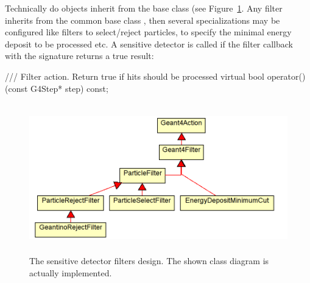 \noindent
Technically do  objects inherit from the base class
 (see Figure~\ref{fig:ddg4-implementation-sensitive-detector-filters}.
Any filter inherits from the common base class , then 
several specializations may be configured like filters to select/reject 
particles, to specify the minimal energy deposit to be processed etc.
A sensitive detector is called if the filter callback with the signature
returns a true result:
\begin{unnumberedcode}
  /// Filter action. Return true if hits should be processed
  virtual bool operator()(const G4Step* step) const;
\end{unnumberedcode}
\begin{figure}[h]
  \begin{center}
    \includegraphics[height=65mm] {DDG4-SensitiveFilterClasses.png}
    \caption{The sensitive detector filters design. The shown class
        diagram is actually implemented.}
    \label{fig:ddg4-implementation-sensitive-detector-filters}
  \end{center}
\end{figure}

\newpage


